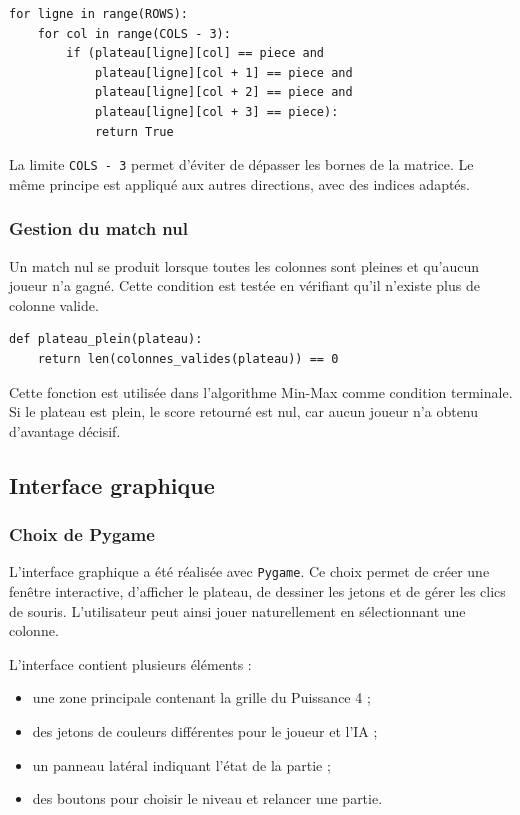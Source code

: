 \documentclass[12pt,a4paper]{article}
\begin{document}
\begin{lstlisting}[style=pythonstyle, caption={Vérification horizontale d'un alignement}]
for ligne in range(ROWS):
    for col in range(COLS - 3):
        if (plateau[ligne][col] == piece and
            plateau[ligne][col + 1] == piece and
            plateau[ligne][col + 2] == piece and
            plateau[ligne][col + 3] == piece):
            return True
\end{lstlisting}

La limite \texttt{COLS - 3} permet d'éviter de dépasser les bornes de la matrice. Le même principe est appliqué aux autres directions, avec des indices adaptés.

\subsubsection{Gestion du match nul}

Un match nul se produit lorsque toutes les colonnes sont pleines et qu'aucun joueur n'a gagné. Cette condition est testée en vérifiant qu'il n'existe plus de colonne valide.

\begin{lstlisting}[style=pythonstyle, caption={Test de plateau plein}]
def plateau_plein(plateau):
    return len(colonnes_valides(plateau)) == 0
\end{lstlisting}

Cette fonction est utilisée dans l'algorithme Min-Max comme condition terminale. Si le plateau est plein, le score retourné est nul, car aucun joueur n'a obtenu d'avantage décisif.


\subsection{Interface graphique}

\subsubsection{Choix de Pygame}

L'interface graphique a été réalisée avec \texttt{Pygame}. Ce choix permet de créer une fenêtre interactive, d'afficher le plateau, de dessiner les jetons et de gérer les clics de souris. L'utilisateur peut ainsi jouer naturellement en sélectionnant une colonne.

L'interface contient plusieurs éléments :

\begin{itemize}[leftmargin=1.2cm]
    \item une zone principale contenant la grille du Puissance 4 ;
    \item des jetons de couleurs différentes pour le joueur et l'IA ;
    \item un panneau latéral indiquant l'état de la partie ;
    \item des boutons pour choisir le niveau et relancer une partie.
\end{itemize}
\end{document}
